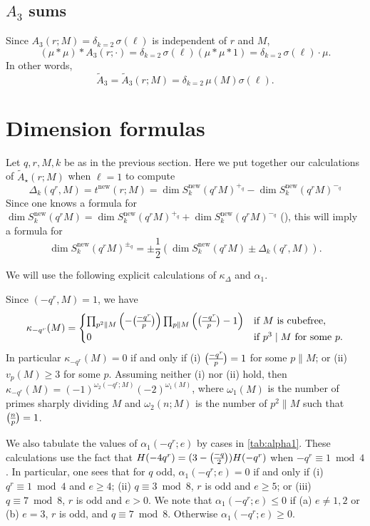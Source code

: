 \documentclass[11pt]{amsart}
\newcommand{\new}{\mathrm{new}}
\renewcommand{\mod}{\bmod}
\newcommand{\bigdot}{\boldsymbol{\cdot}}
\newcommand{\leg}{\overwithdelims ()}
\numberwithin{lem}{section}
\theoremstyle{remark}
\theoremstyle{definition}
\numberwithin{equation}{section}
\begin{document}
\subsection{$A_3$ sums}
Since $A_3(r;M) = \delta_{k=2} \, \sigma(\ell)$ is independent of $r$ and $M$,
\[ (\mu * \mu) * A_3(r; \bigdot) = \delta_{k=2} \, \sigma(\ell) ( \mu * \mu * 1)
= \delta_{k=2} \, \sigma(\ell) \cdot \mu. \]
In other words, 
\begin{equation} \label{eq:AA3}
\tilde A_3 = \tilde A_3(r;M) = \delta_{k=2} \, \mu(M) \sigma(\ell).
\end{equation}


\section{Dimension formulas} \label{sec:dim}


Let $q, r, M, k$ be as in the previous section.
Here we put together our calculations of $\tilde A_\star(r;M)$ when $\ell = 1$ to compute
\[  \Delta_k(q^r, M) = t^\new(r;M) = \dim S_k^\new(q^r M)^{+_q} - \dim S_k^\new(q^r M)^{-_q} \]
Since one knows a formula for $\dim S_k^\new(q^r M) =  \dim S_k^\new(q^r M)^{+_q} + \dim S_k^\new(q^r M)^{-_q}$ (\cite{martin}), this will imply a formula for
\[ \dim S_k^\new(q^r M)^{\pm_q} = \pm \frac 12 \left( \dim S_k^\new(q^r M) \pm \Delta_k(q^r,M) \right). \]

We will use the following explicit calculations of $\kappa_\Delta$ and $\alpha_1$.

Since $(-q^r, M) = 1$, we have
\[ \kappa_{-q^r}(M) = \begin{cases}
\prod_{p^2 \parallel M} \left(- {-q^r \leg p} \right) \prod_{p \parallel M}
\left( {-q^r \leg p} - 1 \right) & \text{if }M \text{ is cubefree}, \\
0 & \text{if }p^3 \mid M \text{ for some } p.
\end{cases}
\]
In particular $\kappa_{-q^r}(M) = 0$ if and only if
(i) ${-q^r \leg p} = 1$ for some $p \parallel M$; or
(ii) $v_p(M) \ge 3$ for some $p$.
Assuming neither (i) nor (ii) hold, then $\kappa_{-q^r}(M) = (-1)^{\omega_2(-q^r; M)} (-2)^{\omega_1(M)}$,
where $\omega_1(M)$ is the number of primes sharply dividing $M$
and $\omega_2(n; M)$ is the number of $p^2 \parallel M$ such that
${n \leg p} = 1$.

We also tabulate the values of $\alpha_1(-q^r; e)$ by cases in \cref{tab:alpha1}.
These calculations use the fact that $H(-4q^r) = (3-{-q \leg 2}) H(-q^r)$ when $-q^r \equiv 1 \mod 4$.  In particular, one sees that for $q$ odd, $\alpha_1(-q^r; e) = 0$ if and only if
(i)  $q^r \equiv 1 \mod 4$ and $e \ge 4$; (ii)  $q \equiv 3 \mod 8$,  $r$ is odd and $e \ge 5$; or (iii) $q \equiv 7 \mod 8$,  $r$ is odd and $e > 0$.  We note that $\alpha_1(-q^r; e) \le 0$ if (a) $e \ne 1, 2$ or (b) $e=3$, $r$ is odd, and $q \equiv 7 \mod 8$.  Otherwise $\alpha_1(-q^r; e) \ge 0$.
\end{document}
